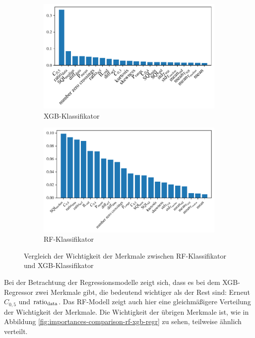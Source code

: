  \begin{figure}[h]
 	\centering
		\begin{subfigure}{.49\textwidth}
			\centering
 			\includegraphics[width=\textwidth]{pic/xgb-clf-final-importances.pdf}
 			\caption{\ac{XGB}-Klassifikator}
 		\end{subfigure}
    	\begin{subfigure}{.49\textwidth}
    		\centering
 			\includegraphics[width=\textwidth]{pic/rf-clf-final-importances.pdf}
 			\caption{\ac{RF}-Klassifikator}
 		\end{subfigure}
 	\caption{Vergleich der Wichtigkeit der Merkmale zwischen \ac{RF}-Klassifikator und \ac{XGB}-Klassifikator}
 	\label{fig:importances-comparison-rf-xgb-clf}
 \end{figure}

Bei der Betrachtung der Regressionsmodelle zeigt sich, dass es bei dem \ac{XGB}-Regressor zwei Merkmale gibt, die bedeutend wichtiger als der Rest sind: Erneut $C_{0,5}$ und $\text{ratio}\textsubscript{data}$. Das \ac{RF}-Modell zeigt auch hier eine gleichmäßigere Verteilung der Wichtigkeit der Merkmale. Die Wichtigkeit der übrigen Merkmale ist, wie in Abbildung \ref{fig:importances-comparison-rf-xgb-regr} zu sehen, teilweise ähnlich verteilt.

